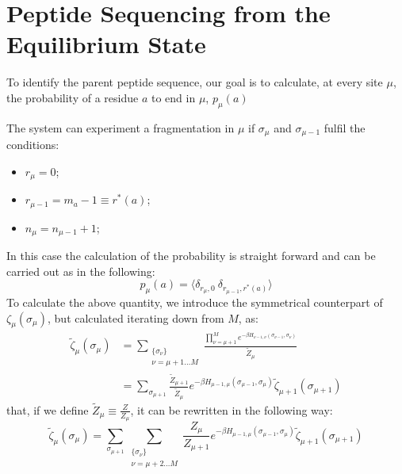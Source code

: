 \section{Peptide Sequencing from the Equilibrium State}
\label{sec:teo-profile}


To identify the parent peptide sequence, our
goal %
is to calculate, at every site $\mu$, the probability of a
residue $a$ to end in $\mu$, $p_\mu(a)$

The system can experiment a fragmentation in $\mu$ if $\sigma_\mu$ and
$\sigma_{\mu-1}$ fulfil the conditions:
\begin{itemize}
\item $r_\mu=0$;
\item $r_{\mu-1}=m_a-1\equiv r^*(a)$;
\item $n_\mu=n_{\mu-1}+1$;
\end{itemize}
In this case the calculation of the probability is straight forward and can be
carried out as in the following:
\begin{equation}
p_\mu(a) =
\langle \delta_{r_\mu,0}\ \delta_{r_{\mu-1},r^*(a)}
\rangle 
\end{equation}
To calculate the above quantity, 
we introduce the symmetrical counterpart of $\zeta_\mu(\sigma_\mu)$, but
calculated iterating down from $M$, as:
\begin{align}
\tilde \zeta_\mu(\sigma_\mu) 
&=
\sum_{\substack{\{\sigma_\nu\}\\\nu=\mu+1\dots M}} \frac
{\prod_{\nu=\mu+1}^M e^{-\beta H_{\nu-1,\nu}(\sigma_{\nu-1},\sigma_\nu)}}
{\tilde Z_\mu} \nonumber\\
&=
\sum_{\sigma_{\mu+1}}
\frac{\tilde Z_{\mu+1}}{\tilde Z_\mu}
e^{-\beta H_{\mu-1,\mu}(\sigma_{\mu-1},\sigma_\mu)}
\tilde\zeta_{\mu+1}(\sigma_{\mu+1})
\label{zeta_mu_tilde}
\end{align}
that, if we define $\tilde Z_\mu \equiv \frac Z {Z_\mu}\label{Z_mu_tilde}$, it
can be rewritten in the following way:
\begin{equation}
\tilde \zeta_\mu(\sigma_\mu) =
\sum_{\sigma_{\mu+1}}
\sum_{\substack{\{\sigma_\nu\}\\\nu=\mu+2\dots M}}
\frac{Z_\mu}{Z_{\mu+1}}
e^{-\beta H_{\mu-1,\mu}(\sigma_{\mu-1},\sigma_\mu)}
\tilde\zeta_{\mu+1}(\sigma_{\mu+1})
\label{zeta_mu_tilde_end}
\end{equation}

